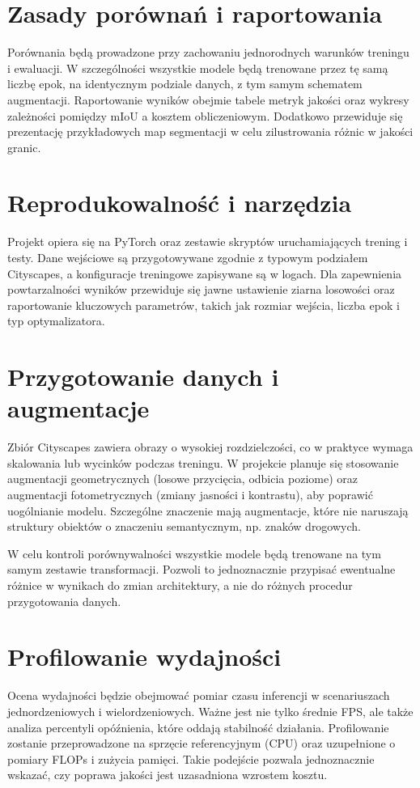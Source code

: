 \documentclass[12pt,oneside,a4paper]{report}
\begin{document}
\section{Zasady porównań i raportowania}
Porównania będą prowadzone przy zachowaniu jednorodnych warunków treningu i
ewaluacji. W szczególności wszystkie modele będą trenowane przez tę samą liczbę
epok, na identycznym podziale danych, z tym samym schematem augmentacji.
Raportowanie wyników obejmie tabele metryk jakości oraz wykresy zależności
pomiędzy mIoU a kosztem obliczeniowym. Dodatkowo przewiduje się prezentację
przykładowych map segmentacji w celu zilustrowania różnic w jakości granic.

\section{Reprodukowalność i narzędzia}
Projekt opiera się na PyTorch oraz zestawie skryptów uruchamiających trening
i testy. Dane wejściowe są przygotowywane zgodnie z typowym podziałem Cityscapes,
a konfiguracje treningowe zapisywane są w logach. Dla zapewnienia powtarzalności
wyników przewiduje się jawne ustawienie ziarna losowości oraz raportowanie
kluczowych parametrów, takich jak rozmiar wejścia, liczba epok i typ optymalizatora.

\section{Przygotowanie danych i augmentacje}
Zbiór Cityscapes zawiera obrazy o wysokiej rozdzielczości, co w praktyce wymaga
skalowania lub wycinków podczas treningu. W projekcie planuje się stosowanie
augmentacji geometrycznych (losowe przycięcia, odbicia poziome) oraz
augmentacji fotometrycznych (zmiany jasności i kontrastu), aby poprawić
uogólnianie modelu. Szczególne znaczenie mają augmentacje, które nie naruszają
struktury obiektów o znaczeniu semantycznym, np. znaków drogowych.

W celu kontroli porównywalności wszystkie modele będą trenowane na tym samym
zestawie transformacji. Pozwoli to jednoznacznie przypisać ewentualne różnice
w wynikach do zmian architektury, a nie do różnych procedur przygotowania danych.

\section{Profilowanie wydajności}
Ocena wydajności będzie obejmować pomiar czasu inferencji w scenariuszach
jednordzeniowych i wielordzeniowych. Ważne jest nie tylko średnie FPS, ale
także analiza percentyli opóźnienia, które oddają stabilność działania.
Profilowanie zostanie przeprowadzone na sprzęcie referencyjnym (CPU) oraz
uzupełnione o pomiary FLOPs i zużycia pamięci. Takie podejście pozwala
jednoznacznie wskazać, czy poprawa jakości jest uzasadniona wzrostem kosztu.
\end{document}
